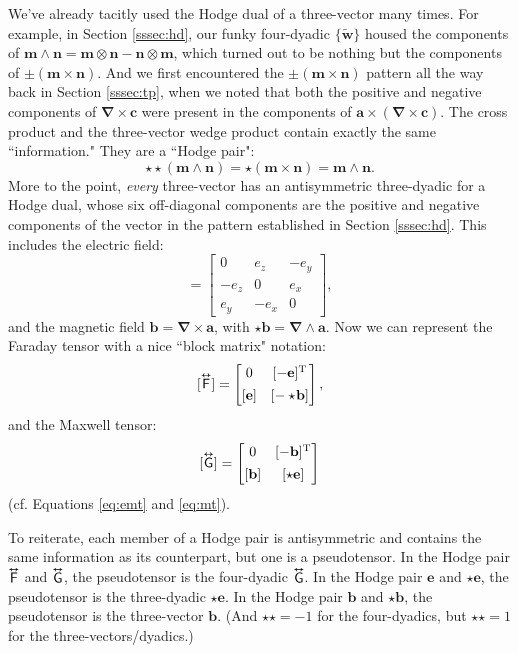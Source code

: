 \documentclass[12pt]{article}
\renewcommand{\vv}[1]{\mathbf{#1}}
\newcommand{\del}{\boldsymbol{\nabla}}
\newcommand{\tightoverset}[2]{%
  \mathop{#2}\limits^{\vbox to -.5ex{\kern-0.75ex\hbox{$#1$}\vss}}}
\newcommand{\inlinedy}[1]{\tightoverset{\text{\tiny$\bm\leftrightarrow$}}{#1}}
\newcommand{\capdy}[1]{ \overset{ \text{\tiny$\bm\leftrightarrow$} }{\vphantom{\text{\small{A}}}\smash{#1}} }
\begin{document}
We've already tacitly used the Hodge dual of a three-vector many times. For example, in Section \ref{sssec:hd}, our funky four-dyadic $\{ \tilde{\vv w} \}$ housed the components of $ \vv m \wedge \vv n = \vv m \otimes \vv n - \vv n \otimes \vv m $, which turned out to be nothing but the components of $\pm ( \vv m \times \vv n )$. And we first encountered the $\pm ( \vv m \times \vv n )$ pattern all the way back in Section \ref{sssec:tp}, when we noted that both the positive and negative components of $\del \times \vv c$ were present in the components of $\vv a \times ( \del \times \vv c )$. The cross product and the three-vector wedge product contain exactly the same ``information." They are a ``Hodge pair":
\begin{equation*}
\star \star ( \vv m \wedge \vv n ) = \star ( \vv m \times \vv n ) = \vv m \wedge \vv n . 
\end{equation*}
More to the point, \emph{every} three-vector has an antisymmetric three-dyadic for a Hodge dual, whose six off-diagonal components are the positive and negative components of the vector in the pattern established in Section \ref{sssec:hd}. This includes the electric field:
\begin{equation*}
[ \star \vv e ]
=
\begin{bmatrix}
0 & e_z & -e_y \\
-e_z & 0 & e_x \\
e_y & -e_x & 0
\end{bmatrix} ,
\end{equation*}
and the magnetic field $\vv b = \del \times \vv a$, with $\star \vv b = \del \wedge \vv a$. Now we can represent the Faraday tensor with a nice ``block matrix" notation:
\begin{equation}\label{eq:ftc}
[ \capdy{\mathsf{F}} ]
=
\begin{bmatrix}
0 & [ - \vv e ]^\mathrm{T} \\[1ex]
[ \vv e ] & [ - \star \mkern-3mu \vv b ]
\end{bmatrix} ,
\end{equation}
and the Maxwell tensor:
\begin{equation}\label{eq:gtc}
[ \capdy{\mathsf{G}} ]
=
\begin{bmatrix}
0 & [ - \vv b ]^\mathrm{T} \\[1ex]
[ \vv b ] & [ \star \vv e ]
\end{bmatrix}
\end{equation}
(cf. Equations \ref{eq:emt} and \ref{eq:mt}).

To reiterate, each member of a Hodge pair is antisymmetric and contains the same information as its counterpart, but one is a pseudotensor. In the Hodge pair $\inlinedy{\mathsf{F}}$ and $\inlinedy{\mathsf{G}}$, the pseudotensor is the four-dyadic $\inlinedy{\mathsf{G}}$. In the Hodge pair $\vv e$ and $\star \vv e$, the pseudotensor is the three-dyadic $\star \vv e$. In the Hodge pair $\vv b$ and $\star \vv b$, the pseudotensor is the three-vector $\vv b$. (And $\star \star = - 1$ for the four-dyadics, but $\star \star = 1$ for the three-vectors/dyadics.)
\end{document}
